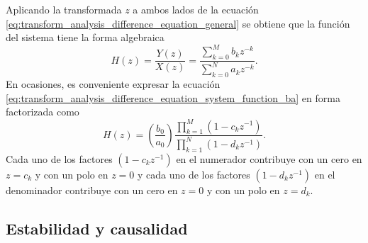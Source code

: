 \documentclass[a4paper]{report}
\begin{document}
Aplicando la transformada \(z\) a ambos lados de la ecuación \ref{eq:transform_analysis_difference_equation_general} se obtiene que la función del sistema tiene la forma algebraica
\begin{equation}\label{eq:transform_analysis_difference_equation_system_function_ba}
 H(z)=\frac{Y(z)}{X(z)}=\frac{\displaystyle\sum_{k=0}^Mb_kz^{-k}}{\displaystyle\sum_{k=0}^Na_kz^{-k}}. 
\end{equation}
En ocasiones, es conveniente expresar la ecuación \ref{eq:transform_analysis_difference_equation_system_function_ba} en forma factorizada como
\begin{equation}\label{eq:transform_analysis_difference_equation_system_function_zp}
 H(z)=\left(\frac{b_0}{a_0}\right)\frac{\prod\limits_{k=1}^M(1-c_kz^{-1})}{\prod\limits_{k=1}^N(1-d_kz^{-1})}. 
\end{equation}
Cada uno de los factores \((1-c_kz^{-1})\) en el numerador contribuye con un cero en \(z=c_k\) y con un polo en \(z=0\) y cada uno de los factores \((1-d_kz^{-1})\) en el denominador contribuye con un cero en \(z=0\) y con un polo en \(z=d_k\). 

\subsection{Estabilidad y causalidad}
\end{document}
